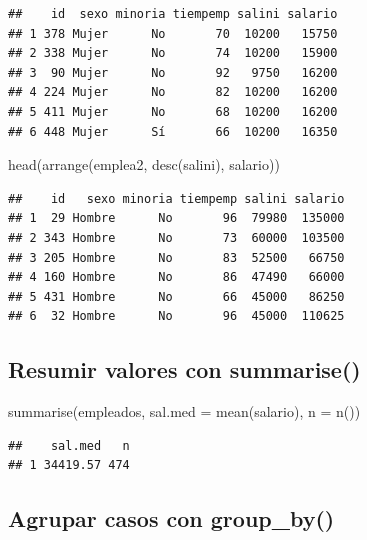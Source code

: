 \documentclass[
]{book}
\newenvironment{Shaded}{\begin{snugshade}}{\end{snugshade}}
\newcommand{\AttributeTok}[1]{\textcolor[rgb]{0.77,0.63,0.00}{#1}}
\newcommand{\FunctionTok}[1]{\textcolor[rgb]{0.00,0.00,0.00}{#1}}
\newcommand{\NormalTok}[1]{#1}
\theoremstyle{break}
\theoremstyle{nonumberplain}
\begin{document}
\begin{verbatim}
##    id  sexo minoria tiempemp salini salario
## 1 378 Mujer      No       70  10200   15750
## 2 338 Mujer      No       74  10200   15900
## 3  90 Mujer      No       92   9750   16200
## 4 224 Mujer      No       82  10200   16200
## 5 411 Mujer      No       68  10200   16200
## 6 448 Mujer      Sí       66  10200   16350
\end{verbatim}

\begin{Shaded}
\begin{Highlighting}[]
\FunctionTok{head}\NormalTok{(}\FunctionTok{arrange}\NormalTok{(emplea2, }\FunctionTok{desc}\NormalTok{(salini), salario))}
\end{Highlighting}
\end{Shaded}

\begin{verbatim}
##    id   sexo minoria tiempemp salini salario
## 1  29 Hombre      No       96  79980  135000
## 2 343 Hombre      No       73  60000  103500
## 3 205 Hombre      No       83  52500   66750
## 4 160 Hombre      No       86  47490   66000
## 5 431 Hombre      No       66  45000   86250
## 6  32 Hombre      No       96  45000  110625
\end{verbatim}

\hypertarget{resumir-valores-con-summarise}{%
\subsection{\texorpdfstring{Resumir valores con \textbf{summarise()}}{Resumir valores con summarise()}}\label{resumir-valores-con-summarise}}

\begin{Shaded}
\begin{Highlighting}[]
\FunctionTok{summarise}\NormalTok{(empleados, }\AttributeTok{sal.med =} \FunctionTok{mean}\NormalTok{(salario), }\AttributeTok{n =} \FunctionTok{n}\NormalTok{())}
\end{Highlighting}
\end{Shaded}

\begin{verbatim}
##    sal.med   n
## 1 34419.57 474
\end{verbatim}

\hypertarget{agrupar-casos-con-group_by}{%
\subsection{\texorpdfstring{Agrupar casos con \textbf{group\_by()}}{Agrupar casos con group\_by()}}\label{agrupar-casos-con-group_by}}
\end{document}
